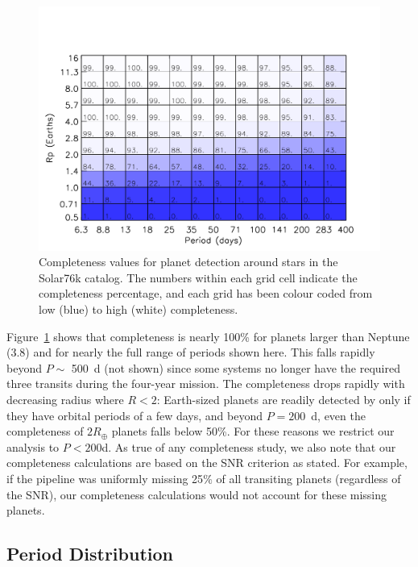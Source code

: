 \begin{figure}
\centerline{\includegraphics[scale=0.55]{chap2/Silburt_completeness.pdf}}
\caption{Completeness values for \kep{} planet detection around stars 
  in the Solar76k catalog. The numbers within each grid cell indicate 
  the completeness percentage, and each grid has been colour coded from low
  (blue) to high (white) completeness.}
\label{fig:sil_compl}
\end{figure}

Figure~\ref{fig:sil_compl} shows that \kep{} completeness is nearly 100\% 
for planets larger than
Neptune (3.8\rearth{}) and for nearly the full range of periods shown
here. This falls rapidly beyond $P \sim $ 500~d (not shown)
since some systems no longer have the required three
transits during the four-year \kep{} mission. The completeness
drops rapidly with decreasing radius where $R<2$\rearth{}:
Earth-sized planets are readily detected by \kep{} only if they have
orbital periods of a few days, and beyond $P=200$~d, even the
completeness of $2 R_\oplus$ planets falls below 50\%. For these
reasons we restrict our analysis to $P < 200$d.   As true of 
any completeness study, we also note that 
our completeness calculations are based on the SNR criterion as 
stated. For example, if the \kep{} pipeline 
was uniformly missing 25$\%$ of all transiting planets (regardless 
of the SNR), our completeness calculations would not account for these
missing planets.



\subsection{Period Distribution}
\label{sec:intperiod}

